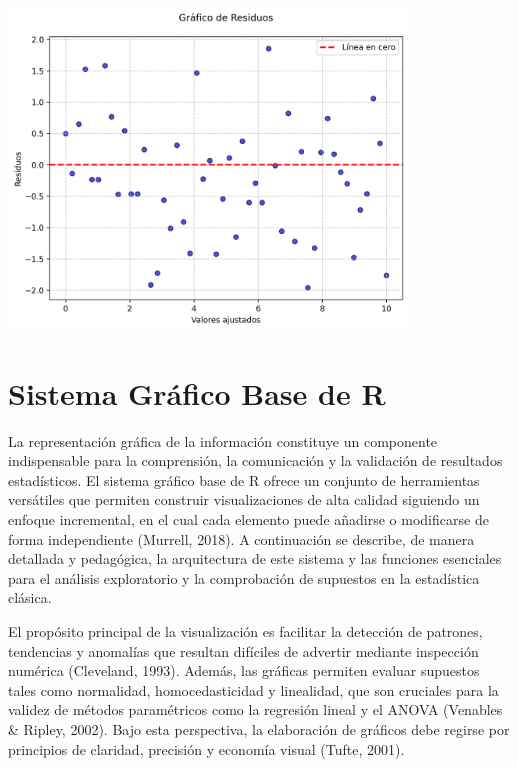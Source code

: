 \documentclass[
  spanish,
  a4paper,
  DIV=11,
  numbers=noendperiod,
  onepage,
  openany]{scrreprt}
\begin{document}
\begin{center}
\includegraphics[width=4.16667in,height=\textheight,keepaspectratio]{images/residuos.png}
\end{center}


\chapter{Sistema Gráfico Base de R}\label{sistema-gruxe1fico-base-de-r}

La representación gráfica de la información constituye un componente
indispensable para la comprensión, la comunicación y la validación de
resultados estadísticos. El sistema gráfico base de R ofrece un conjunto
de herramientas versátiles que permiten construir visualizaciones de
alta calidad siguiendo un enfoque incremental, en el cual cada elemento
puede añadirse o modificarse de forma independiente (Murrell, 2018). A
continuación se describe, de manera detallada y pedagógica, la
arquitectura de este sistema y las funciones esenciales para el análisis
exploratorio y la comprobación de supuestos en la estadística clásica.

El propósito principal de la visualización es facilitar la detección de
patrones, tendencias y anomalías que resultan difíciles de advertir
mediante inspección numérica (Cleveland, 1993). Además, las gráficas
permiten evaluar supuestos tales como normalidad, homocedasticidad y
linealidad, que son cruciales para la validez de métodos paramétricos
como la regresión lineal y el ANOVA (Venables \& Ripley, 2002). Bajo
esta perspectiva, la elaboración de gráficos debe regirse por principios
de claridad, precisión y economía visual (Tufte, 2001).
\end{document}
